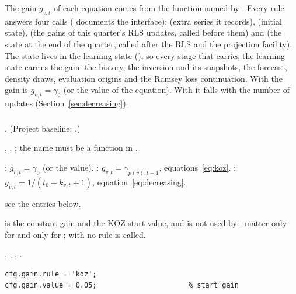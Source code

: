 \documentclass[11pt,a4paper]{article}
\DeclareRobustCommand{\codem}[1]{\texttt{\detokenize{#1}}}
\newenvironment{optspec}%
  {\begin{description}[style=sameline,leftmargin=2.7cm,labelwidth=2.5cm,font=\normalfont\itshape]}%
  {\end{description}}
\begin{document}
The gain $g_{v,t}$ of each equation comes from the function  named by
. Every rule answers four calls ( documents the
interface):  (extra series it records),  (initial state),
 (the gains of this quarter's RLS updates, called before them) and 
(the state at the end of the quarter, called after the RLS and the projection facility). The
state lives in the learning state (), so every stage that carries the learning state
carries the gain: the history, the inversion and its snapshots, the forecast, density draws,
evaluation origins and the Ramsey loss continuation. With  the gain is
$g_{v,t} = \gamma_0$ (or the  value of the equation). With
 it falls with the number of updates (Section~\ref{sec:decreasing}).

\subsubsection{\texorpdfstring{\codem{gain.rule}}{gain.rule}}\label{opt:gain-rule}
\begin{optspec}
  \item[Default] . (Project baseline: .)
  \item[Values] , , ; the name must be a
        function in .
  \item[Math] : $g_{v,t} = \gamma_0$ (or the  value).
        : $g_{v,t} = \gamma_{p(v),t-1}$, equations~\eqref{eq:koz}.
        : $g_{v,t} = 1/(t_0 + k_{v,t} + 1)$, equation~\eqref{eq:decreasing}.
  \item[Assumptions] see the entries below.
  \item[Interactions]  is the constant gain and the KOZ start value, and is
        not used by ;  matter only for  and
         only for ; with
         no rule is called.
  \item[Code] , , ,
        .
  \item[Example]
\begin{lstlisting}
cfg.gain.rule = 'koz';
cfg.gain.value = 0.05;                      % start gain
\end{lstlisting}
\end{optspec}
\end{document}

